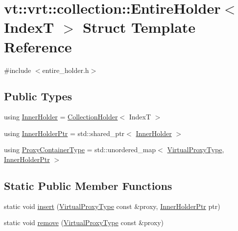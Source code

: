 \hypertarget{structvt_1_1vrt_1_1collection_1_1_entire_holder}{}\section{vt\+:\+:vrt\+:\+:collection\+:\+:Entire\+Holder$<$ IndexT $>$ Struct Template Reference}
\label{structvt_1_1vrt_1_1collection_1_1_entire_holder}


{\ttfamily \#include $<$entire\+\_\+holder.\+h$>$}

\subsection*{Public Types}
\begin{DoxyCompactItemize}
\item 
using \hyperlink{structvt_1_1vrt_1_1collection_1_1_entire_holder_a2af69c9521932d43624a7ba5b64bebbe}{Inner\+Holder} = \hyperlink{structvt_1_1vrt_1_1collection_1_1_collection_holder}{Collection\+Holder}$<$ IndexT $>$
\item 
using \hyperlink{structvt_1_1vrt_1_1collection_1_1_entire_holder_a05b515860b3cb0eac013993a5e487b72}{Inner\+Holder\+Ptr} = std\+::shared\+\_\+ptr$<$ \hyperlink{structvt_1_1vrt_1_1collection_1_1_entire_holder_a2af69c9521932d43624a7ba5b64bebbe}{Inner\+Holder} $>$
\item 
using \hyperlink{structvt_1_1vrt_1_1collection_1_1_entire_holder_a8d1ceab08d81edb0d45f48ee84a05eea}{Proxy\+Container\+Type} = std\+::unordered\+\_\+map$<$ \hyperlink{namespacevt_a1b417dd5d684f045bb58a0ede70045ac}{Virtual\+Proxy\+Type}, \hyperlink{structvt_1_1vrt_1_1collection_1_1_entire_holder_a05b515860b3cb0eac013993a5e487b72}{Inner\+Holder\+Ptr} $>$
\end{DoxyCompactItemize}
\subsection*{Static Public Member Functions}
\begin{DoxyCompactItemize}
\item 
static void \hyperlink{structvt_1_1vrt_1_1collection_1_1_entire_holder_aecd10b8636b011dbd5681030d636d185}{insert} (\hyperlink{namespacevt_a1b417dd5d684f045bb58a0ede70045ac}{Virtual\+Proxy\+Type} const \&proxy, \hyperlink{structvt_1_1vrt_1_1collection_1_1_entire_holder_a05b515860b3cb0eac013993a5e487b72}{Inner\+Holder\+Ptr} ptr)
\item 
static void \hyperlink{structvt_1_1vrt_1_1collection_1_1_entire_holder_ad505d79024df92c9dc36a5debd3875ec}{remove} (\hyperlink{namespacevt_a1b417dd5d684f045bb58a0ede70045ac}{Virtual\+Proxy\+Type} const \&proxy)
\end{DoxyCompactItemize}
